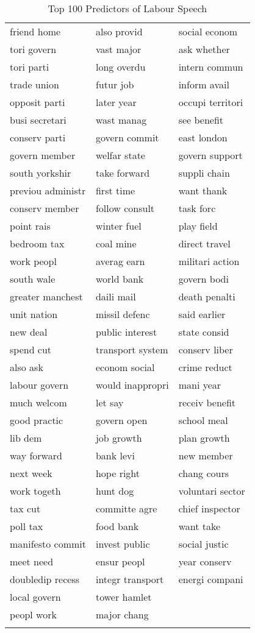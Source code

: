 \begingroup\scriptsize
\begin{longtable}{p{}p{}p{}}
\caption{Top 100 Predictors of Labour Speech} \\ 
  \hline
  \hline
friend home & also provid & social econom \\ 
  tori govern & vast major & ask whether \\ 
  tori parti & long overdu & intern commun \\ 
  trade union & futur job & inform avail \\ 
  opposit parti & later year & occupi territori \\ 
  busi secretari & wast manag & see benefit \\ 
  conserv parti & govern commit & east london \\ 
  govern member & welfar state & govern support \\ 
  south yorkshir & take forward & suppli chain \\ 
  previou administr & first time & want thank \\ 
  conserv member & follow consult & task forc \\ 
  point rais & winter fuel & play field \\ 
  bedroom tax & coal mine & direct travel \\ 
  work peopl & averag earn & militari action \\ 
  south wale & world bank & govern bodi \\ 
  greater manchest & daili mail & death penalti \\ 
  unit nation & missil defenc & said earlier \\ 
  new deal & public interest & state consid \\ 
  spend cut & transport system & conserv liber \\ 
  also ask & econom social & crime reduct \\ 
  labour govern & would inappropri & mani year \\ 
  much welcom & let say & receiv benefit \\ 
  good practic & govern open & school meal \\ 
  lib dem & job growth & plan growth \\ 
  way forward & bank levi & new member \\ 
  next week & hope right & chang cours \\ 
  work togeth & hunt dog & voluntari sector \\ 
  tax cut & committe agre & chief inspector \\ 
  poll tax & food bank & want take \\ 
  manifesto commit & invest public & social justic \\ 
  meet need & ensur peopl & year conserv \\ 
  doubledip recess & integr transport & energi compani \\ 
  local govern & tower hamlet &  \\ 
  peopl work & major chang &  \\ 
   \hline
\hline
\label{tab:top_100c}
\end{longtable}
\endgroup
